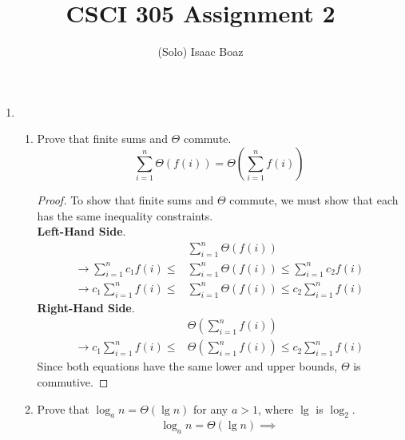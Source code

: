 \documentclass{article}
\title{CSCI 305 Assignment 2}
\author{(Solo) Isaac Boaz}
\begin{document}
\maketitle

\begin{enumerate}
    \item  \begin{enumerate}[label=\arabic*.]
              \item Prove that finite sums and $\Theta$ commute.
                    \begin{equation*}
                        \sum_{i=1}^{n}{\Theta(f(i))} = \Theta(\sum_{i=1}^{n}{f(i)})
                    \end{equation*}
                    \begin{proof}
                        To show that finite sums and $\Theta$ commute, we must show that each has the same inequality constraints. \\[1em]
                        \textbf{Left-Hand Side}.
                        \begin{align*}
                                                                     & \sum_{i=1}^{n}{\Theta(f(i))}                              \\
                            \rightarrow \sum_{i=1}^{n}{c_1f(i)} \leq & \sum_{i=1}^{n}{\Theta(f(i))} \leq \sum_{i=1}^{n}{c_2f(i)} \\
                            \rightarrow c_1\sum_{i=1}^{n}{f(i)} \leq & \sum_{i=1}^{n}{\Theta(f(i))} \leq c_2\sum_{i=1}^{n}{f(i)}
                        \end{align*}
                        \textbf{Right-Hand Side}.
                        \begin{align*}
                                                                     & \Theta(\sum_{i=1}^{n}{f(i)})                              \\
                            \rightarrow c_1\sum_{i=1}^{n}{f(i)} \leq & \Theta(\sum_{i=1}^{n}{f(i)}) \leq c_2\sum_{i=1}^{n}{f(i)}
                        \end{align*}
                        Since both equations have the same lower and upper bounds, $\Theta$ is commutive.
                    \end{proof}
              \item Prove that \(\log_an = \Theta(\lg n)\) for any \(a > 1\), where \(\lg\) is \(\log_2\).
                    \begin{align*}
                        \log_an = \Theta(\lg n) \implies                          \\

\end{align*}
\end{enumerate}
\end{enumerate}
\end{document}
